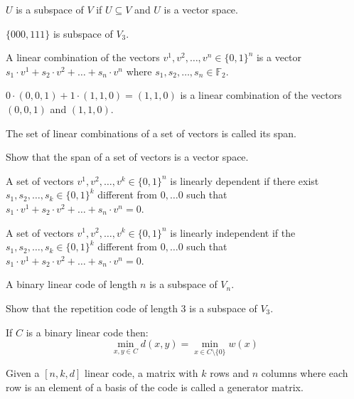 \begin{definition}
$U$ is a subspace of $V$ if $U\subseteq V$ and $U$ is a vector space.
\end{definition}
\begin{example}
$\{000,111\}$ is subspace of $V_3$.
\end{example}
\begin{definition}
A linear combination of the vectors $v^1,v^2,\ldots,v^n\in \{0,1\}^n$ is a vector $s_1\cdot v^1+s_2\cdot v^2+\ldots+s_n\cdot v^n$ where $s_1,s_2,\ldots,s_n\in\mathbb F_2$.
\end{definition}
\begin{example}
$0\cdot(0,0,1)+1\cdot(1,1,0)=(1,1,0)$ is a linear combination of the vectors $(0,0,1)$ and $(1,1,0)$.
\end{example}
\begin{definition}
The set of linear combinations of a set of vectors is called its span.
\end{definition}
\begin{exercise}
Show that the span of a set of vectors is a vector space.
\end{exercise}
\begin{definition}
A set of vectors $v^1,v^2,\ldots,v^k\in \{0,1\}^n$ is linearly dependent if there exist $s_1,s_2,\ldots,s_k\in\{0,1\}^k$ different from $0,\ldots 0$ such that $s_1\cdot v^1+s_2\cdot v^2+\ldots+s_n\cdot v^n=0$.
\end{definition}
\begin{definition}
A set of vectors $v^1,v^2,\ldots,v^k\in \{0,1\}^n$ is linearly independent if the  $s_1,s_2,\ldots,s_k\in\{0,1\}^k$ different from $0,\ldots 0$ such that $s_1\cdot v^1+s_2\cdot v^2+\ldots+s_n\cdot v^n=0$.
\end{definition}
A binary linear code of length $n$ is a subspace of $V_n$.
\begin{exercise}
Show that the repetition code of length 3 is a subspace of $V_3$.
\end{exercise}
\begin{exercise}
If $C$ is a binary linear code then:
\begin{equation}
\min_{x,y\in C}d(x,y)=\min_{x\in C\setminus\{0\}}w(x)
\end{equation}
\end{exercise}
\begin{definition}
Given a $[n,k,d]$ linear code, a matrix with $k$ rows and $n$ columns where each row is an element of a basis of the code is called a generator matrix.
\end{definition}

